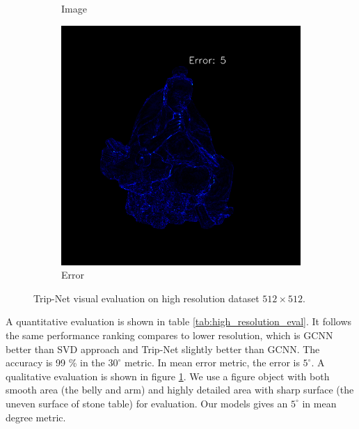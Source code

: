 \begin{figure}[th]
\begin{subfigure}[b]{0.32\linewidth}
		\caption{Image}
	\end{subfigure}
	\begin{subfigure}[b]{0.32\linewidth}
		\includegraphics[width=\linewidth]{./Figures/comparison_512/fancy_eval_11_error_Trip-Net-512.png}
		\caption{Error}
	\end{subfigure}
	
	\decoRule
	\caption{Trip-Net visual evaluation on high resolution dataset $ 512 \times 512 $.}
	\label{fig:trip-eval-high-resolution}
\end{figure}







A quantitative evaluation is shown in table \ref{tab:high_resolution_eval}. It follows the same performance ranking compares to lower resolution, which is GCNN better than SVD approach and Trip-Net slightly better than GCNN. The accuracy is 99 \% in the $ 30^\circ $ metric. In mean error metric, the error is  $ 5^\circ $.  A qualitative evaluation is shown in figure \ref{fig:trip-eval-high-resolution}. We use a figure object with both smooth area (the belly and arm) and highly detailed area with sharp surface (the uneven surface of stone table) for evaluation. Our models gives an  $ 5^\circ $ in mean degree metric. 

